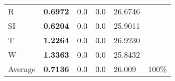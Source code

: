 \documentclass[11pt, a4paper]{article}
\begin{document}
\begin{table}[H]
\begin{tabular}{llllll}
R                                & \textbf{0.6972}                   & 0.0                               & 0.0                                  & 26.6746                                     &                                   \\
SI                        & \textbf{0.6204}                   & 0.0                               & 0.0                                  & 25.9011                                     &                                   \\
T                              & \textbf{1.2264}                   & 0.0                               & 0.0                                  & 26.9230                                     &                                   \\
W                             & \textbf{1.3363}                   & 0.0                               & 0.0                                  & 25.8432                                     &                                   \\ \hline
Average                               & \textbf{0.7136}                   & 0.0                               & 0.0                                  & 26.009                                      & 100\%
\end{tabular}
\end{table}
\end{document}
